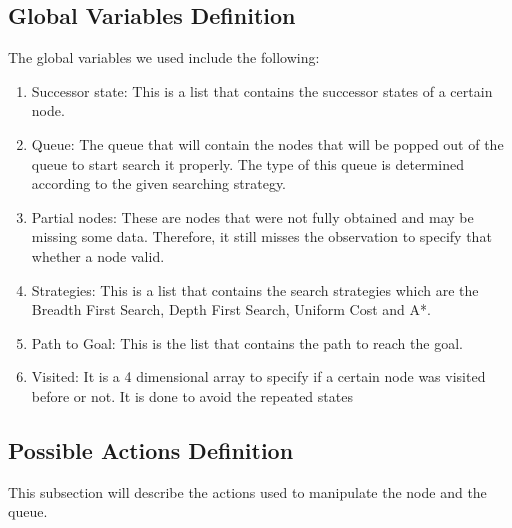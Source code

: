 
\subsection{Global Variables Definition}
	
	The global variables we used include the following: 
		\begin{enumerate}
			\item{Successor state: This is a list that contains the successor states of a certain node.}
			\item{Queue: The queue that will contain the nodes that will be popped out of the queue to start search it properly. The type of this queue is determined according to the given searching strategy.}
			\item{Partial nodes: These are nodes that were not fully obtained and may be missing some data. Therefore, it still misses the observation to specify that whether a node valid.}
			\item{Strategies: This is a list that contains the search strategies which are the Breadth First Search, Depth First Search, Uniform Cost and A*.}
			\item{Path to Goal: This is the list that contains the path to reach the goal.}
			\item{Visited: It is a 4 dimensional array to specify if a certain node was visited before or not. It is done to avoid the repeated states}
		\end{enumerate}

\subsection{Possible Actions Definition}

This subsection will describe the actions used to manipulate the node and the queue.

